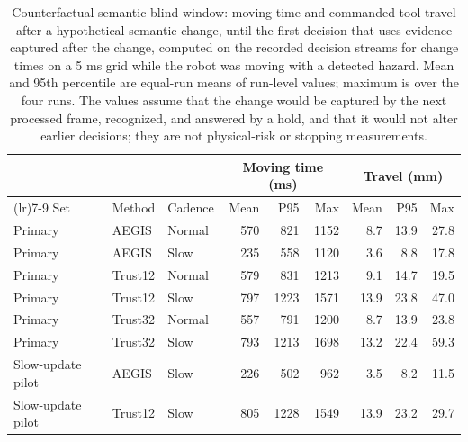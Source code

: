 \begin{table}[H]\centering\small
\caption{Counterfactual semantic blind window: moving time and commanded tool travel after a hypothetical semantic change, until the first decision that uses evidence captured after the change, computed on the recorded decision streams for change times on a 5 ms grid while the robot was moving with a detected hazard. Mean and 95th percentile are equal-run means of run-level values; maximum is over the four runs. The values assume that the change would be captured by the next processed frame, recognized, and answered by a hold, and that it would not alter earlier decisions; they are not physical-risk or stopping measurements.}\label{tab:blind-window}
\begin{tabularx}{\linewidth}{>{\raggedright\arraybackslash}Xllrrrrrr}
\toprule & & & \multicolumn{3}{c}{Moving time (ms)} & \multicolumn{3}{c}{Travel (mm)}\\ \cmidrule(lr){4-6}\cmidrule(lr){7-9}
Set & Method & Cadence & Mean & P95 & Max & Mean & P95 & Max\\ \midrule
Primary & AEGIS & Normal & 570 & 821 & 1152 & 8.7 & 13.9 & 27.8\\
Primary & AEGIS & Slow & 235 & 558 & 1120 & 3.6 & 8.8 & 17.8\\
Primary & Trust12 & Normal & 579 & 831 & 1213 & 9.1 & 14.7 & 19.5\\
Primary & Trust12 & Slow & 797 & 1223 & 1571 & 13.9 & 23.8 & 47.0\\
Primary & Trust32 & Normal & 557 & 791 & 1200 & 8.7 & 13.9 & 23.8\\
Primary & Trust32 & Slow & 793 & 1213 & 1698 & 13.2 & 22.4 & 59.3\\
Slow-update pilot & AEGIS & Slow & 226 & 502 & 962 & 3.5 & 8.2 & 11.5\\
Slow-update pilot & Trust12 & Slow & 805 & 1228 & 1549 & 13.9 & 23.2 & 29.7\\
\bottomrule
\end{tabularx}
\end{table}
